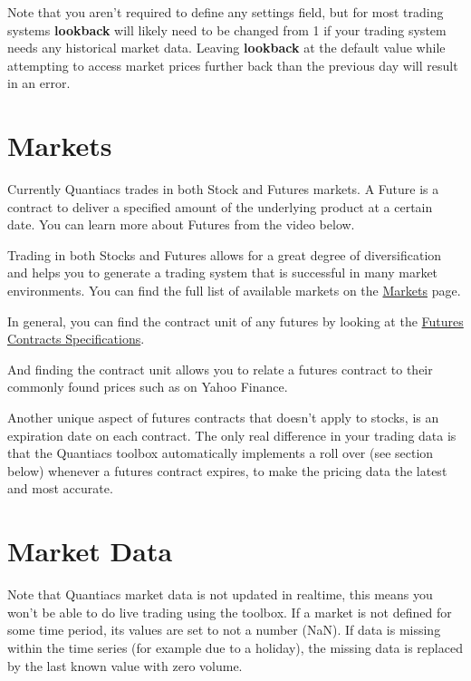 \documentclass[letterpaper,10pt,english]{sphinxmanual}
\begin{document}
Note that you aren't required to define any settings field, but for most trading systems \textbf{lookback} will likely need to be changed from 1 if your trading system needs any historical market data. Leaving \textbf{lookback} at the default value while attempting to access market prices further back than the previous day will result in an error.


\section{Markets}
\label{settings:markets}
Currently Quantiacs trades in both Stock and Futures markets. A Future is a contract to deliver a specified amount of the underlying product at a certain date. You can learn more about Futures from the video below.

Trading in both Stocks and Futures allows for a great degree of diversification and helps you to generate a trading system that is successful in many market environments. You can find the full list of available markets on the \href{https://quantiacs.com/For-Quants/GetStarted/Markets.aspx}{Markets} page.

In general, you can find the contract unit of any futures by looking at the \href{http://www.barchart.com/futures/specifications.php}{Futures Contracts Specifications}.

And finding the contract unit allows you to relate a futures contract to their commonly found prices such as on Yahoo Finance.

Another unique aspect of futures contracts that doesn't apply to stocks, is an expiration date on each contract. The only real difference in your trading data is that the Quantiacs toolbox automatically implements a roll over (see {\hyperref[settings:rollover\string-label]{}} section below) whenever a futures contract expires, to make the pricing data the latest and most accurate.


\section{Market Data}
\label{settings:market-data}
Note that Quantiacs market data is not updated in realtime, this means you won't be able to do live trading using the toolbox. If a market is not defined for some time period, its values are set to not a number (NaN). If data is missing within the time series (for example due to a holiday), the missing data is replaced by the last known value with zero volume.
\end{document}
